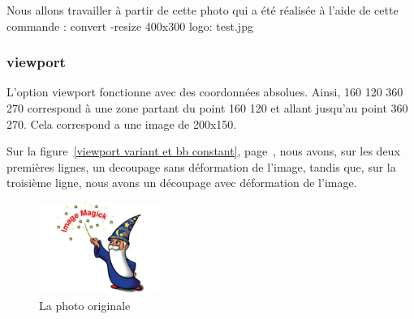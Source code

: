 \documentclass[french]{article}
\begin{document}
Nous allons travailler à partir de cette photo qui a été réalisée à l'aide de cette commande :
convert -resize 400x300 logo: test.jpg

\subsubsection{viewport}

L'option viewport fonctionne avec des coordonnées absolues.
Ainsi, {160 120 360 270} correspond à une zone partant du point {160 120}
et allant jusqu'au point {360 270}.
Cela correspond a une image de 200x150.

Sur la figure~\ref{viewport variant et bb constant}, page~\pageref{viewport variant et bb constant},
nous avons, sur les deux premières lignes, un decoupage sans déformation de l'image, 
tandis que, sur la troisième ligne, nous avons un découpage avec déformation de l'image.

\begin{figure}[!h]
  \centering
  \includegraphics[bb=0 0 400 300,height=3cm]{test.jpg}
  \caption{La photo originale}
  \label{Photo originale}
\end{figure}
\end{document}
